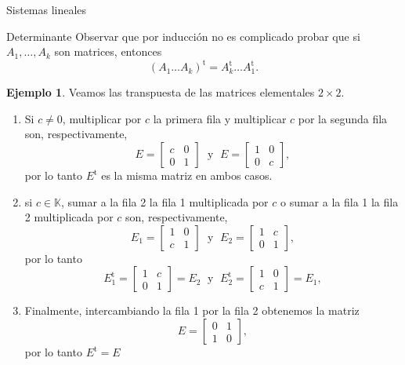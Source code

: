 \documentclass[a4paper,12pt,twoside,spanish]{amsbook}
\theoremstyle{definition}
\newtheorem{ejemplo}{Ejemplo}[section]
\theoremstyle{remark}
\renewcommand{\t}{{\operatorname{t}}}
\newcommand{\K}{\mathbb K}
\begin{document}
\begin{chapter}{Sistemas lineales}
\begin{section}{Determinante}
	Observar que por inducción no es complicado probar que si $A_1,\ldots, A_k$ son matrices,  entonces 
	\begin{equation*}
	(A_1\ldots A_k)^\t = A_k^\t\ldots A_1^\t.
	\end{equation*}
	
	\begin{ejemplo} Veamos las transpuesta de las matrices elementales  $2 \times 2$.
		\begin{enumerate}
			\item Si $c \not=0$, multiplicar por  $c$ la primera fila y multiplicar $c$ por la segunda fila son, respectivamente,
			\begin{equation*}
			E = \begin{bmatrix} c& 0\\ 0&1\end{bmatrix}\;\text{ y }\; E = \begin{bmatrix} 1& 0\\ 0&c\end{bmatrix},
			\end{equation*}
			por lo tanto $E^\t$ es la misma matriz en ambos casos. 
			\item si  $c \in \K$, sumar a la fila 2 la fila 1 multiplicada por $c$ o sumar a la fila 1 la fila 2 multiplicada por $c$ son, respectivamente,
			\begin{equation*}
			E_1 = \begin{bmatrix} 1& 0\\ c&1\end{bmatrix}\;\text{ y }\; E_2 = \begin{bmatrix} 1& c\\ 0&1\end{bmatrix},
			\end{equation*}
			por lo tanto 
			\begin{equation*}
			E_1^\t = \begin{bmatrix} 1& c\\ 0&1\end{bmatrix} = E_2 \;\text{ y }\; E_2^\t = \begin{bmatrix} 1& 0\\ c&1\end{bmatrix} =E_1,
			\end{equation*}
			\item Finalmente, intercambiando la fila 1 por la fila 2 obtenemos la matriz
			\begin{equation*}
			E = \begin{bmatrix} 0& 1\\ 1&0\end{bmatrix},
			\end{equation*}
			por lo tanto $E^\t =E$
		\end{enumerate}
	\end{ejemplo}
	


\end{section}
\end{chapter}
\end{document}

